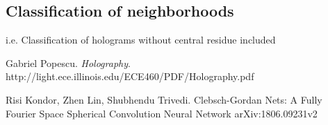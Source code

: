 \documentclass{article}
\begin{document}
\subsection{Classification of neighborhoods}

i.e. Classification of holograms without central residue included



\begin{thebibliography}{}
Gabriel Popescu. 
\textit{Holography}.
http://light.ece.illinois.edu/ECE460/PDF/Holography.pdf

Risi Kondor, Zhen Lin, Shubhendu Trivedi.
Clebsch-Gordan Nets: A Fully Fourier Space Spherical Convolution Neural Network
arXiv:1806.09231v2
\end{thebibliography}
\end{document}

